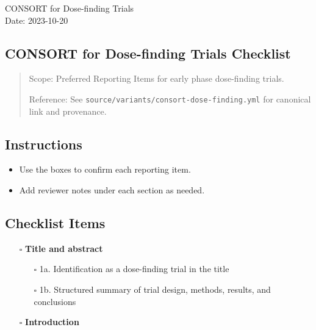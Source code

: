 \documentclass[11pt]{article}
\def\tightlist{}
\begin{document}
\begin{center}
{\LARGE CONSORT for Dose-finding Trials}\\[4pt]
\normalsize Date: 2023-10-20
\end{center}
\vspace{1em}

\begin{Form}

\section{CONSORT for Dose-finding Trials
Checklist}\label{consort-for-dose-finding-trials-checklist}

\begin{quote}
Scope: Preferred Reporting Items for early phase dose-finding trials.

Reference: See \texttt{source/variants/consort-dose-finding.yml} for
canonical link and provenance.
\end{quote}

\subsection{Instructions}\label{instructions}

\begin{itemize}
\tightlist
\item
  Use the boxes to confirm each reporting item.
\item
  Add reviewer notes under each section as needed.
\end{itemize}

\subsection{Checklist Items}\label{checklist-items}

\begin{itemize}
\tightlist
\item[$\square$]
  \textbf{Title and abstract}

  \begin{itemize}
  \tightlist
  \item[$\square$]
    1a. Identification as a dose-finding trial in the title
  \item[$\square$]
    1b. Structured summary of trial design, methods, results, and
    conclusions
  \end{itemize}
\item[$\square$]
  \textbf{Introduction}


\end{itemize}
\end{Form}
\end{document}
